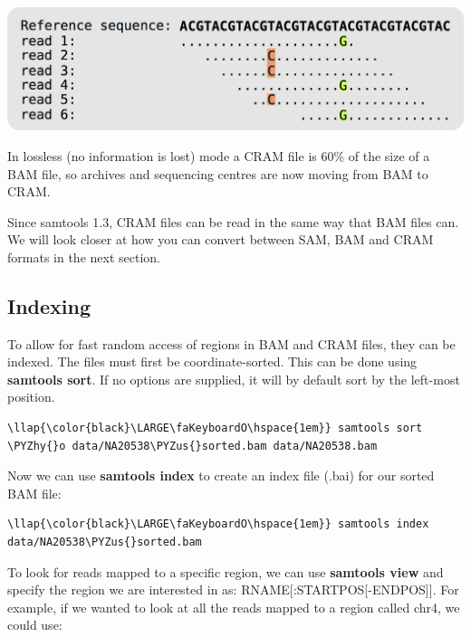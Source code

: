 \documentclass[11pt]{article}
\makeatletter
\def\maxwidth{\ifdim\Gin@nat@width>\linewidth\linewidth
    \else\Gin@nat@width\fi}
\let\Oldincludegraphics\includegraphics
\renewcommand{\includegraphics}[1]{\Oldincludegraphics[width=.8\maxwidth, height=.55\textheight, keepaspectratio]{#1}}
\def\PYZus{\char`\_}
\def\PYZhy{\char`\-}
\makeatother
\begin{document}
    \includegraphics{img/CRAM_format2.png}

    In lossless (no information is lost) mode a CRAM file is 60\% of the
size of a BAM file, so archives and sequencing centres are now moving
from BAM to CRAM.

Since samtools 1.3, CRAM files can be read in the same way that BAM
files can. We will look closer at how you can convert between SAM, BAM
and CRAM formats in the next section.

    \hypertarget{indexing}{%
\subsection{Indexing}\label{indexing}}

To allow for fast random access of regions in BAM and CRAM files, they
can be indexed. The files must first be coordinate-sorted. This can be
done using \textbf{samtools sort}. If no options are supplied, it will
by default sort by the left-most position.

\begin{terminalinput}
\begin{Verbatim}[commandchars=\\\{\}]
\llap{\color{black}\LARGE\faKeyboardO\hspace{1em}} samtools sort \PYZhy{}o data/NA20538\PYZus{}sorted.bam data/NA20538.bam
\end{Verbatim}
\end{terminalinput}

    Now we can use \textbf{samtools index} to create an index file (.bai)
for our sorted BAM file:

\begin{terminalinput}
\begin{Verbatim}[commandchars=\\\{\}]
\llap{\color{black}\LARGE\faKeyboardO\hspace{1em}} samtools index data/NA20538\PYZus{}sorted.bam
\end{Verbatim}
\end{terminalinput}

    To look for reads mapped to a specific region, we can use
\textbf{samtools view} and specify the region we are interested in as:
RNAME{[}:STARTPOS{[}-ENDPOS{]}{]}. For example, if we wanted to look at
all the reads mapped to a region called chr4, we could use:
\end{document}
